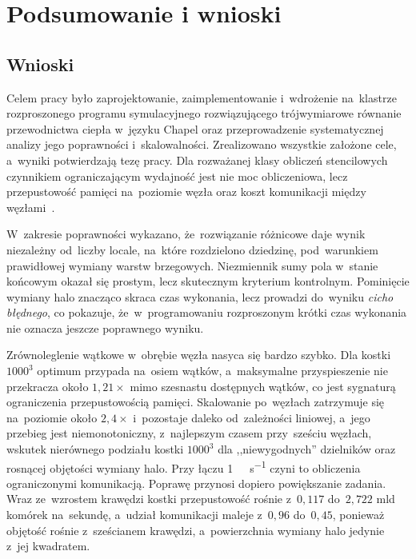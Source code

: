 \chapter{Podsumowanie i wnioski}
\label{ch:podsumowanie}

\section{Wnioski}
\label{sec:wnioski}

Celem pracy było zaprojektowanie, zaimplementowanie i~wdrożenie na~klastrze rozproszonego
programu symulacyjnego rozwiązującego trójwymiarowe równanie przewodnictwa ciepła w~języku Chapel oraz przeprowadzenie
systematycznej analizy jego poprawności i~skalowalności. Zrealizowano wszystkie założone cele,
a~wyniki potwierdzają tezę pracy. Dla rozważanej klasy
obliczeń stencilowych czynnikiem ograniczającym wydajność jest nie moc obliczeniowa, lecz
przepustowość pamięci na~poziomie węzła oraz koszt komunikacji między węzłami~\cite{roofline}.

W~zakresie poprawności wykazano, że~rozwiązanie różnicowe daje wynik niezależny
od~liczby locale, na~które rozdzielono dziedzinę, pod~warunkiem prawidłowej wymiany warstw
brzegowych. Niezmiennik sumy pola w~stanie końcowym okazał się prostym, lecz skutecznym
kryterium kontrolnym. Pominięcie wymiany halo znacząco skraca czas wykonania, lecz prowadzi
do~wyniku \emph{cicho błędnego}, co pokazuje, że~w~programowaniu rozproszonym krótki czas
wykonania nie oznacza jeszcze poprawnego wyniku.

Zrównoleglenie wątkowe w~obrębie węzła nasyca się bardzo szybko. Dla kostki $1000^3$ optimum
przypada na~osiem wątków, a~maksymalne przyspieszenie nie przekracza około $1{,}21\times$ mimo
szesnastu dostępnych wątków, co jest sygnaturą ograniczenia przepustowością pamięci. Skalowanie
po~węzłach zatrzymuje się na~poziomie około $2{,}4\times$ i~pozostaje daleko od~zależności
liniowej, a~jego przebieg jest niemonotoniczny, z~najlepszym czasem przy~sześciu węzłach,
wskutek nierównego podziału kostki $1000^3$ dla ,,niewygodnych'' dzielników oraz rosnącej
objętości wymiany halo. Przy łączu \SI{1}{\giga\bit\per\second} czyni to obliczenia
ograniczonymi komunikacją. Poprawę przynosi dopiero powiększanie zadania. Wraz ze~wzrostem
krawędzi kostki przepustowość rośnie z~$0{,}117$ do~$2{,}722$ mld komórek na~sekundę,
a~udział komunikacji maleje z~$0{,}96$ do~$0{,}45$, ponieważ objętość rośnie z~sześcianem
krawędzi, a~powierzchnia wymiany halo jedynie z~jej kwadratem.

